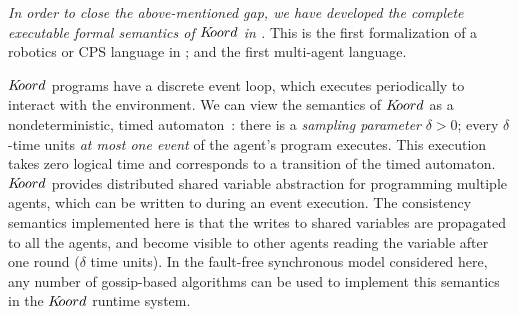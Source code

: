 {\em In order to close the above-mentioned gap, we have developed the complete executable formal semantics of $K\kern-2pt oord$ in \K.} This is the first formalization of a robotics or CPS language in \K;  and the first multi-agent language. 



$K\kern-2pt oord$ programs have a discrete event loop, which executes periodically to interact with the environment. We can view the semantics of  $K\kern-2pt oord$ as a nondeterministic, timed automaton~\cite{TIOAmon}: there is a {\em sampling parameter\/} $\delta > 0$; every $\delta$-time units {\em at most one event} of the agent's program executes. This execution takes zero logical time and corresponds to a transition of the timed automaton. $K\kern-2pt oord$ provides distributed shared variable abstraction for programming multiple agents, which can be written to during an event execution. The consistency semantics implemented here is that the writes to shared variables are propagated to all the agents, and become visible to other agents reading the variable after one round ($\delta$ time units). In the fault-free synchronous model considered here, any number of gossip-based algorithms can be used to implement this semantics in the $K\kern-2pt oord$ runtime system. 


